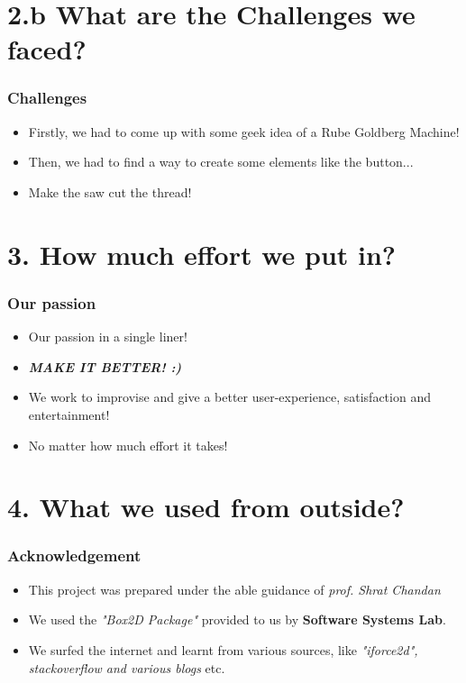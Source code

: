\documentclass{beamer}
\begin{document}
\section{2.b What are the Challenges we faced?} 
\begin{frame}
\frametitle{Challenges} \begin{itemize}
   \item Firstly, we had to come up with some geek idea of a Rube Goldberg Machine! \pause
   \item Then, we had to find a way to create some elements like the button... \pause
   \item Make the saw cut the thread! 
\end{itemize}
\end{frame}


\section{3. How much effort we put in?}
\begin{frame}
\frametitle{Our passion} 
\begin{itemize}
   \item Our passion in a single liner!\pause
   \item \textbf{\emph{MAKE IT BETTER! :)}} \pause
   \item We work to improvise and give a better user-experience, satisfaction and entertainment!\pause
   \item No matter how much effort it takes!
\end{itemize} 
\end{frame}

\section{4. What we used from outside?}
\begin{frame}
\frametitle{Acknowledgement} 
\begin{itemize}
   \item This project was prepared under the able guidance of \emph{prof. Shrat Chandan}
   \item We used the \emph{"Box2D Package"} provided to us by \textbf{Software Systems Lab}.
   \item We surfed the internet and learnt from various sources, like 
\emph{"iforce2d", stackoverflow and various blogs} etc.
\end{itemize} 
\end{frame}
\end{document}
